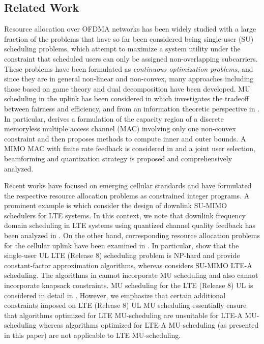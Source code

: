 \documentclass[11pt] {article}
\begin{document}
 \subsection{Related Work}
Resource allocation over  OFDMA networks has been widely studied
 \cite{YuW:dual,OFDMA:Game:Globecom:08,Lee:DLinfo} with  a large fraction of the   problems that have so far been  considered  being single-user (SU) scheduling problems, which attempt to maximize a system utility under  the constraint that scheduled users can only be assigned  non-overlapping  subcarriers. These problems  have been formulated as {\em continuous optimization problems}, and since they are in general non-linear and non-convex,
 many approaches including those
based on  game theory  \cite{OFDMA:Game:Globecom:08} and dual decomposition \cite{YuW:dual}  have been developed.
MU scheduling in the uplink has been considered in \cite{SDMAprasad} which investigates the tradeoff between fairness and efficiency, and from an information theoretic perspective in \cite{capacityPalomar}. In particular, \cite{capacityPalomar} derives a formulation of the capacity region of a discrete memoryless multiple access  channel (MAC) involving only one non-convex constraint and then proposes methods to   compute inner and outer bounds. A MIMO MAC with finite rate feedback is considered in \cite{beamDai}  and a joint user selection, beamforming and quantization strategy is proposed and comprehensively analyzed. 

Recent works have focused on emerging cellular standards and have formulated the respective resource allocation problems as constrained integer programs. A prominent example
 is \cite{Lee:DLinfo} which consider the design of downlink SU-MIMO schedulers for LTE  systems. In this context, we note that downlink frequency domain scheduling in LTE systems using quantized channel quality feedback has been analyzed in  \cite{Donthi:downlink}. On the other hand,  corresponding resource allocation problems for the cellular uplink have been examined in  \cite{multiserver:2009,Yang:ULinfo,prasad:globe11,Lee-UL-2009}. In particular, \cite{multiserver:2009,Yang:ULinfo,Lee-UL-2009} show  that the single-user UL LTE (Release 8) scheduling problem is NP-hard and provide  constant-factor approximation algorithms, whereas \cite{prasad:globe11} considers SU-MIMO LTE-A scheduling. The algorithms in \cite{multiserver:2009,Yang:ULinfo,prasad:globe11,Lee-UL-2009}   cannot incorporate MU scheduling  and also cannot incorporate knapsack constraints. MU scheduling for the LTE (Release 8) UL is considered in detail in \cite{prasad:wiopt12}. However, we emphasize that certain additional constraints imposed on LTE (Release 8) UL MU scheduling essentially ensure  that   algorithms optimized for LTE MU-scheduling are unsuitable for LTE-A MU-scheduling whereas algorithms optimized for LTE-A MU-scheduling (as presented in this paper) are not applicable to LTE MU-scheduling. 
\end{document}
